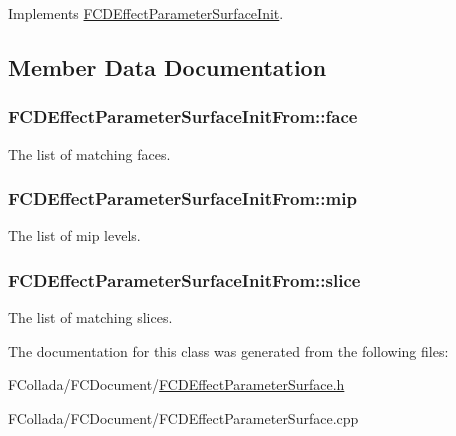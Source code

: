 Implements \hyperlink{classFCDEffectParameterSurfaceInit_ad0109233e63c892e5963a3ca67f7108f}{FCDEffectParameterSurfaceInit}.



\subsection{Member Data Documentation}
\hypertarget{classFCDEffectParameterSurfaceInitFrom_a78e6c19391ebf68c392be301db666ac8}{
\subsubsection[{face}]{ {\bf FCDEffectParameterSurfaceInitFrom::face}}}
\label{classFCDEffectParameterSurfaceInitFrom_a78e6c19391ebf68c392be301db666ac8}
The list of matching faces. \hypertarget{classFCDEffectParameterSurfaceInitFrom_ac7df5eff72c2fa2a183bacdfc3ac3799}{
\subsubsection[{mip}]{ {\bf FCDEffectParameterSurfaceInitFrom::mip}}}
\label{classFCDEffectParameterSurfaceInitFrom_ac7df5eff72c2fa2a183bacdfc3ac3799}
The list of mip levels. \hypertarget{classFCDEffectParameterSurfaceInitFrom_a9abea30f2ccd2f28a50d5678d22135cb}{
\subsubsection[{slice}]{ {\bf FCDEffectParameterSurfaceInitFrom::slice}}}
\label{classFCDEffectParameterSurfaceInitFrom_a9abea30f2ccd2f28a50d5678d22135cb}
The list of matching slices. 

The documentation for this class was generated from the following files:\begin{DoxyCompactItemize}
\item 
FCollada/FCDocument/\hyperlink{FCDEffectParameterSurface_8h}{FCDEffectParameterSurface.h}\item 
FCollada/FCDocument/FCDEffectParameterSurface.cpp\end{DoxyCompactItemize}
